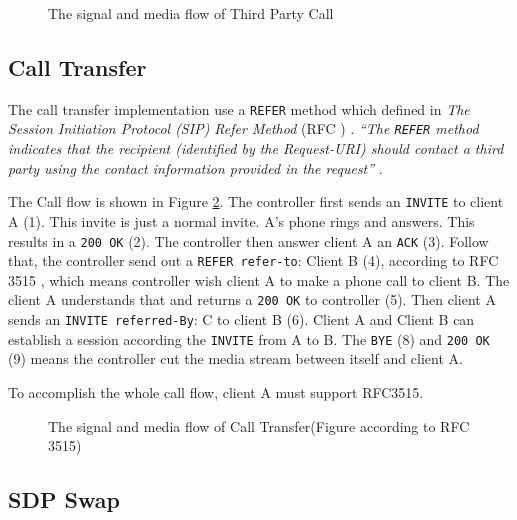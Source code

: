 \begin{figure}[!hbtp]
\centering
{}
\caption{The signal and media flow of Third Party Call}
\label{fig:TheSignalAndMediaFlowOf3pc}
\end{figure}

\subsection{Call Transfer}
\label{sec:Solution:ThirdPartyCall:CallTransfer}

The call transfer implementation use a \texttt{REFER} method which defined in \textit{The Session Initiation Protocol (SIP) Refer Method} (RFC \nobreak {}) \cite{RFC3515}. \textit{``The \texttt{REFER} method indicates that the recipient (identified by the Request-URI) should contact a third party using the contact information provided in the request''} \cite{RFC3515}. 

The Call flow is shown in Figure \ref{fig:CallTransfer}. The controller first sends an \texttt{INVITE} to client A (1). This invite is just a normal invite. A's phone rings and answers. This results in a \texttt{200 OK} (2). The controller then answer client A an \texttt{ACK} (3). Follow that, the controller send out a \texttt{REFER refer-to}: Client B (4), according to RFC 3515 \cite{RFC3515}, which means controller wish client A to make a phone call to client B. The client A understands that and returns a \texttt{200 \nolinebreak OK} to controller (5). Then client A sends an \texttt{INVITE referred-By}: C to client B (6). Client A and Client B can establish a session according the \texttt{INVITE} from A to B.  The \texttt{BYE} (8) and \texttt{200 \nolinebreak OK} (9) means the controller cut the media stream between itself and client A. 

To accomplish the whole call flow, client A must support RFC3515.

\begin{figure}[!hbtp]
\centering
{}
\caption{The signal and media flow of Call Transfer(Figure according to RFC 3515\cite{RFC3515})}
\label{fig:CallTransfer}
\end{figure}

\subsection{SDP Swap}
\label{sec:Solution:ThirdPartyCall:SDPSwep}

